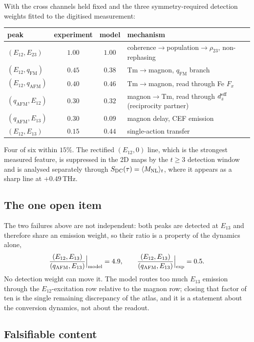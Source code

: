 \documentclass[11pt,a4paper]{article}
\newcommand{\qafm}{q_{\mathrm{AFM}}}
\newcommand{\qfm}{q_{\mathrm{FM}}}
\newcommand{\Mnl}{M_{\rm NL}}
\begin{document}
With the cross channels held fixed and the three symmetry-required
detection weights fitted to the digitised measurement:
\begin{center}\small
\renewcommand{\arraystretch}{1.2}
\begin{tabular}{lccl}
\toprule
peak & experiment & model & mechanism\\
\midrule
$(E_{12},E_{23})$ & $1.00$ & $1.00$ &
  coherence$\to$population$\to\rho_{23}$, non-rephasing\\
$(E_{12},\qfm)$ & $0.45$ & $0.38$ & Tm$\to$magnon, $\qfm$ branch\\
$(E_{12},\qafm)$ & $0.40$ & $0.46$ & Tm$\to$magnon, read through Fe $F_x$\\
$(\qafm,E_{12})$ & $0.30$ & $0.32$ &
  magnon$\to$Tm, read through $d_z^{\rm eff}$ (reciprocity partner)\\
$(\qafm,E_{13})$ & $0.30$ & $0.09$ & magnon delay, CEF emission\\
$(E_{12},E_{13})$ & $0.15$ & $0.44$ & single-action transfer\\
\bottomrule
\end{tabular}
\end{center}
Four of six within $15\%$.  The rectified $(E_{12},0)$ line, which is
the strongest measured feature, is suppressed in the 2D maps by the
$t\geq3$ detection window and is analysed separately through
$S_{\rm DC}(\tau)=\langle\Mnl\rangle_t$, where it appears as a sharp
line at $+0.49$\,THz.

\subsection{The one open item}
\label{sec:openitem}

The two failures above are not independent: both peaks are detected at
$E_{13}$ and therefore share an emission weight, so their ratio is a
property of the dynamics alone,
\begin{equation}
  \frac{(E_{12},E_{13})}{(\qafm,E_{13})}\Big|_{\rm model}=4.9,
  \qquad
  \frac{(E_{12},E_{13})}{(\qafm,E_{13})}\Big|_{\rm exp}=0.5 .
\end{equation}
No detection weight can move it.  The model routes too much $E_{13}$
emission through the $E_{12}$-excitation row relative to the magnon
row; closing that factor of ten is the single remaining discrepancy of
the atlas, and it is a statement about the conversion dynamics, not
about the readout.

\subsection{Falsifiable content}
\label{sec:predictions2}
\end{document}
